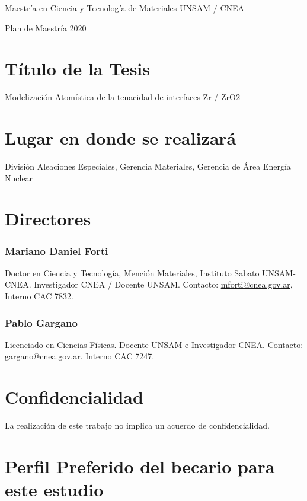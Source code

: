 \begin{center}

Maestría en Ciencia y Tecnología de Materiales UNSAM / CNEA

Plan de Maestría 2020

\end{center}

\section{ Título de la Tesis }

Modelización Atomística de la tenacidad de interfaces Zr / ZrO2

\section{ Lugar en donde se realizará }
División Aleaciones Especiales, Gerencia Materiales, Gerencia de Área Energía 
Nuclear

\section{Directores}

\subsubsection{Mariano Daniel Forti}

Doctor en Ciencia y Tecnología, Mención Materiales, Instituto Sabato 
UNSAM-CNEA. Investigador CNEA / Docente UNSAM. 
Contacto: \href{mailto:mforti@cnea.gov.ar}{mforti@cnea.gov.ar}, Interno CAC 7832.

\subsubsection{Pablo Gargano}

Licenciado en Ciencias Físicas. Docente UNSAM e Investigador CNEA.
Contacto: \href{mailto:gargano@cnea.gov.ar}{gargano@cnea.gov.ar}. Interno CAC 7247.

\section{Confidencialidad}

La realización de este trabajo no implica un acuerdo de confidencialidad.

\section{Perfil Preferido del becario para este estudio}

